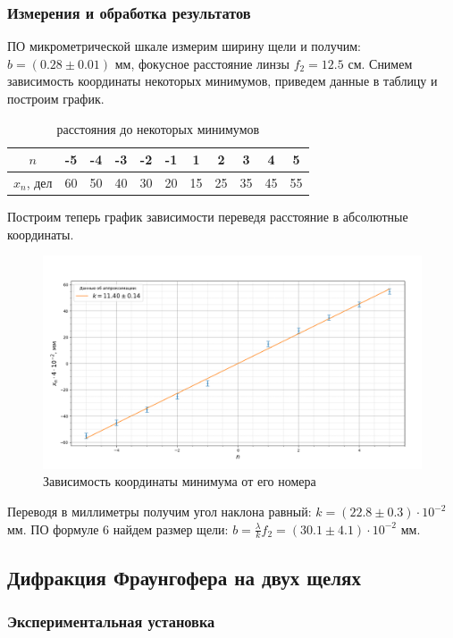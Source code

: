 \documentclass[a4paper, 12pt]{article}%
\begin{document}
	 \subsubsection{Измерения и обработка результатов}
	 ПО микрометрической шкале измерим ширину щели и получим: $b = (0.28 \pm 0.01)$ мм, фокусное расстояние линзы $f_2 = 12.5$ см.
	 Снимем зависимость координаты некоторых минимумов, приведем данные в таблицу и построим график.
	 \begin{table}[H]
	 	\centering
	 	\begin{tabular}{|c|c|c|c|c|c|c|c|c|c|c|}
	 		\hline
	 		$n$   & -5 & -4 & -3 & -2 & -1 & 1  & 2  & 3  & 4  & 5  \\ \hline
	 		$x_n$, дел & 60 & 50 & 40 & 30 & 20 & 15 & 25 & 35 & 45 & 55 \\ \hline
	 	\end{tabular}
 	\caption{расстояния до некоторых минимумов}
	 \end{table}
 	Построим теперь график зависимости переведя расстояние в абсолютные координаты.
 	\begin{figure}[H]
 		\centering
 		\includegraphics[width=0.9\linewidth]{Figure_2}
 		\caption{Зависимость координаты минимума от его номера}
 		\label{fig:figure2}
 	\end{figure}
 	Переводя в миллиметры получим угол наклона равный: $k = (22.8 \pm 0.3)\cdot 10^{-2}$ мм.
 	ПО формуле 6 найдем размер щели: $b = \frac{\lambda}{k}f_2 = (30.1 \pm 4.1) \cdot 10^{-2}$ мм.
 	\subsection{Дифракция Фраунгофера на двух щелях}
 	
 	\subsubsection{Экспериментальная установка}
 	
\end{document}
